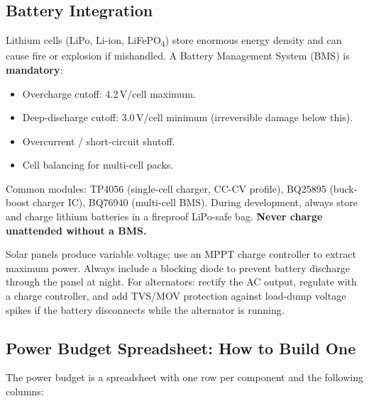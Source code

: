\documentclass[11pt,letterpaper,twoside,openany]{book}
\begin{document}
\subsection{Battery Integration}
\label{sec:battery}

Lithium cells (LiPo, Li-ion, LiFePO\textsubscript{4}) store enormous energy density and can cause fire or explosion if mishandled. A Battery Management System (BMS) is \textbf{mandatory}:

\begin{itemize}[nosep,leftmargin=1.5em]
  \item Overcharge cutoff: 4.2\,V/cell maximum.
  \item Deep-discharge cutoff: 3.0\,V/cell minimum (irreversible damage below this).
  \item Overcurrent / short-circuit shutoff.
  \item Cell balancing for multi-cell packs.
\end{itemize}

Common modules: TP4056 (single-cell charger, CC-CV profile), BQ25895 (buck-boost charger IC), BQ76940 (multi-cell BMS). During development, always store and charge lithium batteries in a fireproof LiPo-safe bag. \textbf{Never charge unattended without a BMS.}

\begin{tipbox}
Solar panels produce variable voltage; use an MPPT charge controller to extract maximum power. Always include a blocking diode to prevent battery discharge through the panel at night. For alternators: rectify the AC output, regulate with a charge controller, and add TVS/MOV protection against load-dump voltage spikes if the battery disconnects while the alternator is running.
\end{tipbox}



\subsection{Power Budget Spreadsheet: How to Build One}
The power budget is a spreadsheet with one row per component and the following columns:
\end{document}
